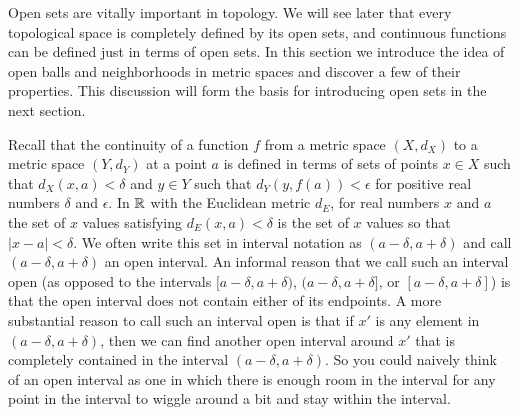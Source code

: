 \label{chap:open_balls}


\vspace*{-17 pt}

\vspace*{13 pt}

\label{sec_open_balls_intro}
Open sets are vitally important in topology. We will see later that every topological space is completely defined by its open sets, and continuous functions can be defined just in terms of open sets. In this section we introduce the idea of open balls and neighborhoods in metric spaces and discover a few of their properties. This discussion will form the basis for introducing open sets in the next section.

Recall that the continuity of a function $f$ from a metric space $(X, d_X)$ to a metric space $(Y, d_Y)$ at a point $a$ is defined in terms of sets of points $x \in X$ such that $d_X(x,a) < \delta$ and $y \in Y$ such that $d_Y(y, f(a)) < \epsilon$ for positive real numbers $\delta$ and $\epsilon$. In $\mathbb{R}$ with the Euclidean metric $d_E$, for real numbers $x$ and $a$ the set of $x$ values satisfying $d_E(x,a) < \delta$ is the set of $x$ values so that $| x-a | < \delta$. We often write this set in interval notation as $(a-\delta, a+\delta)$ and call $(a-\delta, a+\delta)$ an open interval. An informal reason that we call such an interval open (as opposed to the intervals $[a-\delta, a+\delta)$, $(a-\delta, a+\delta]$, or $[a-\delta, a+\delta]$) is that the open interval does not contain either of its endpoints. A more substantial reason to call such an interval open is that if $x'$ is any element in $(a-\delta, a+\delta)$, then we can find another open interval around $x'$ that is completely contained in the interval $(a-\delta, a+\delta)$. So you could naively think of an open interval as one in which there is enough room in the interval for any point in the interval to wiggle around a bit and stay within the interval. 

